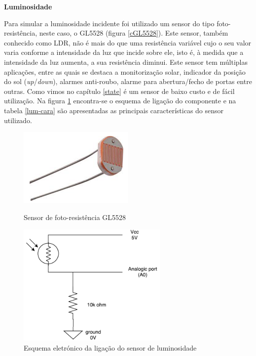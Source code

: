 \textbf{Luminosidade}



Para simular a luminosidade incidente foi utilizado um sensor do tipo foto-resistência, neste caso, o GL5528 (figura \ref{cGL5528}). Este sensor, também conhecido como \ac{LDR}, não é mais do que uma resistência variável cujo o seu valor varia conforme a intensidade da luz que incide sobre ele, isto é, à medida que a intensidade da luz aumenta, a sua resistência diminui. Este sensor tem múltiplas aplicações, entre as quais se destaca a monitorização solar, indicador da posição do sol (\textit{up}/\textit{down}), alarmes anti-roubo, alarme para abertura/fecho de portas entre outras. Como vimos no capítulo \ref{state} é um sensor de baixo custo e de fácil utilização. Na figura \ref{lum-esquema} encontra-se o esquema de ligação do componente e na tabela \ref{lum-cara} são apresentadas as principais características do sensor utilizado. 







\begin{figure}[h]
	\centering
	\begin{minipage}[b]{0.49\textwidth}
		\centering
		\includegraphics[width=0.5\textwidth]{img/hardware/luminosidade.png}
		\caption{Sensor de foto-resistência GL5528}
		\label{cGL5528}
	\end{minipage}
	\hfill
	\begin{minipage}[b]{0.49\textwidth}
		\centering
		\includegraphics[width=0.65\textwidth]{img/hardware/lumi_esquema.pdf}
		\caption{Esquema eletrónico da ligação do sensor de luminosidade}
		\label{lum-esquema}
	\end{minipage}
\end{figure}







